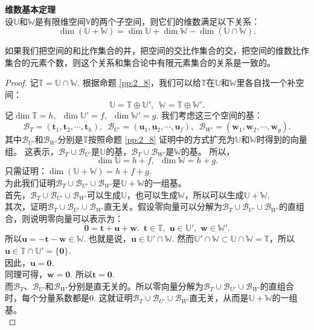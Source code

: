 \documentclass[12pt,UTF8,fontset=none]{ctexbook}
\begin{document}
\begin{pp}\textbf{维数基本定理}\label{pp:2_13}\\
    设$\mathbb{U}$和$\mathbb{W}$是有限维空间$\mathbb{V}$的两个子空间，则它们的维数满足以下关系：
    $$ \dim (\mathbb{U} + \mathbb{W}) = \dim \mathbb{U} + \dim \mathbb{W} - \dim (\mathbb{U} \cap \mathbb{W}).$$
\end{pp}
如果我们把空间的和比作集合的并，把空间的交比作集合的交，把空间的维数比作集合的元素个数，则这个关系和集合论中有限元素集合的关系是一致的。
\begin{proof} %
    记$\mathbb{T} = \mathbb{U} \cap \mathbb{W}$. 根据命题 \ref{pp:2_8}，我们可以给$\mathbb{T}$在$\mathbb{U}$和$\mathbb{W}$里各自找一个补空间：
    $$ \mathbb{U} = \mathbb{T} \oplus \mathbb{U}', \,\,\, \mathbb{W} = \mathbb{T} \oplus \mathbb{W}'.$$
    记$\dim \mathbb{T} = h, \,\,\, \dim \mathbb{U}' = f, \,\,\, \dim \mathbb{W}' = g$. 我们考虑这三个空间的基：
    $$ \mathcal{B}_T = (\mathbf{t}_1, \mathbf{t}_2, \cdots, \mathbf{t}_h), \,\,\, \mathcal{B}_{U'} = (\mathbf{u}_1, \mathbf{u}_2, \cdots, \mathbf{u}_f), \,\,\, \mathcal{B}_{W'} = (\mathbf{w}_1, \mathbf{w}_2, \cdots, \mathbf{w}_g). $$  
    其中$\mathcal{B}_{U'}$和$\mathcal{B}_{W'}$分别是$\mathbb{T}$按照命题 \ref{pp:2_8} 证明中的方式扩充为$\mathbb{U}$和$\mathbb{W}$时得到的向量组。
    这表示，$\mathcal{B}_T\cup\mathcal{B}_{U'}$是$\mathbb{U}$的基，$\mathcal{B}_T\cup\mathcal{B}_{W'}$是$\mathbb{W}$的基。
    所以，
    $$\dim \mathbb{U} = h + f,\,\,\,\dim \mathbb{W} = h + g.$$
    只需证明：$ \dim (\mathbb{U} + \mathbb{W}) = h + f + g.$\\
    为此我们证明$\mathcal{B}_T\cup\mathcal{B}_{U'}\cup\mathcal{B}_{W'}$是$\mathbb{U} + \mathbb{W}$的一组基。\\
    首先，$\mathcal{B}_T\cup\mathcal{B}_{U'}\cup\mathcal{B}_{W'}$可以生成$\mathbb{U}$，也可以生成$\mathbb{W}$，所以可以生成$\mathbb{U} + \mathbb{W}$.\\
    其次，证明$\mathcal{B}_T\cup\mathcal{B}_{U'}\cup\mathcal{B}_{W'}$直无关。假设零向量可以分解为$\mathcal{B}_T\cup\mathcal{B}_{U'}\cup\mathcal{B}_{W'}$的直组合，则说明零向量可以表示为：
    $$ \mathbf{0} = \mathbf{t} + \mathbf{u} + \mathbf{w}. \,\,\,\mathbf{t}\in\mathbb{T},\,\,\mathbf{u}\in\mathbb{U}',\,\,\mathbf{w}\in\mathbb{W}'.$$
    所以$\mathbf{u} = -\mathbf{t} - \mathbf{w} \in \mathbb{W}$.
    也就是说，$\mathbf{u}\in \mathbb{U}'\cap\mathbb{W}$.
    然而$\mathbb{U}'\cap\mathbb{W} \subset \mathbb{U}\cap\mathbb{W} = \mathbb{T}$，所以$\mathbf{u}\in\mathbb{T}\cap\mathbb{U}' = \{\mathbf{0}\}$.\\
    因此，$\mathbf{u} = \mathbf{0}.$\\
    同理可得，$\mathbf{w} = \mathbf{0}.$ 所以$\mathbf{t} = \mathbf{0}.$\\
    而$\mathcal{B}_T$、$\mathcal{B}_{U'}$和$\mathcal{B}_{W'}$分别是直无关的。所以零向量分解为$\mathcal{B}_T\cup\mathcal{B}_{U'}\cup\mathcal{B}_{W'}$的直组合时，每个分量系数都是0. 
    这就证明$\mathcal{B}_T\cup\mathcal{B}_{U'}\cup\mathcal{B}_{W'}$直无关，从而是$\mathbb{U} + \mathbb{W}$的一组基。\\
\end{proof}
\end{document}
